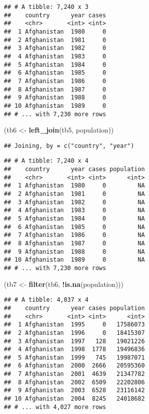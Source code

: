 \documentclass[]{article}
\newenvironment{Shaded}{\begin{snugshade}}{\end{snugshade}}
\newcommand{\KeywordTok}[1]{\textcolor[rgb]{0.13,0.29,0.53}{\textbf{#1}}}
\newcommand{\NormalTok}[1]{#1}
\newcommand{\OperatorTok}[1]{\textcolor[rgb]{0.81,0.36,0.00}{\textbf{#1}}}
\newcommand{\StringTok}[1]{\textcolor[rgb]{0.31,0.60,0.02}{#1}}
\begin{document}
\begin{verbatim}
## # A tibble: 7,240 x 3
##    country      year cases
##    <chr>       <int> <int>
##  1 Afghanistan  1980     0
##  2 Afghanistan  1981     0
##  3 Afghanistan  1982     0
##  4 Afghanistan  1983     0
##  5 Afghanistan  1984     0
##  6 Afghanistan  1985     0
##  7 Afghanistan  1986     0
##  8 Afghanistan  1987     0
##  9 Afghanistan  1988     0
## 10 Afghanistan  1989     0
## # ... with 7,230 more rows
\end{verbatim}

\begin{Shaded}
\begin{Highlighting}[]
\NormalTok{(tb6 <-}\StringTok{ }\KeywordTok{left_join}\NormalTok{(tb5, population))}
\end{Highlighting}
\end{Shaded}

\begin{verbatim}
## Joining, by = c("country", "year")
\end{verbatim}

\begin{verbatim}
## # A tibble: 7,240 x 4
##    country      year cases population
##    <chr>       <int> <int>      <int>
##  1 Afghanistan  1980     0         NA
##  2 Afghanistan  1981     0         NA
##  3 Afghanistan  1982     0         NA
##  4 Afghanistan  1983     0         NA
##  5 Afghanistan  1984     0         NA
##  6 Afghanistan  1985     0         NA
##  7 Afghanistan  1986     0         NA
##  8 Afghanistan  1987     0         NA
##  9 Afghanistan  1988     0         NA
## 10 Afghanistan  1989     0         NA
## # ... with 7,230 more rows
\end{verbatim}

\begin{Shaded}
\begin{Highlighting}[]
\NormalTok{(tb7 <-}\StringTok{ }\KeywordTok{filter}\NormalTok{(tb6, }\OperatorTok{!}\KeywordTok{is.na}\NormalTok{(population)))}
\end{Highlighting}
\end{Shaded}

\begin{verbatim}
## # A tibble: 4,037 x 4
##    country      year cases population
##    <chr>       <int> <int>      <int>
##  1 Afghanistan  1995     0   17586073
##  2 Afghanistan  1996     0   18415307
##  3 Afghanistan  1997   128   19021226
##  4 Afghanistan  1998  1778   19496836
##  5 Afghanistan  1999   745   19987071
##  6 Afghanistan  2000  2666   20595360
##  7 Afghanistan  2001  4639   21347782
##  8 Afghanistan  2002  6509   22202806
##  9 Afghanistan  2003  6528   23116142
## 10 Afghanistan  2004  8245   24018682
## # ... with 4,027 more rows
\end{verbatim}
\end{document}
